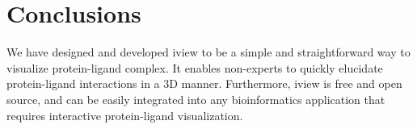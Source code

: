 \documentclass[twocolumn]{bmcart}%
\begin{document}
\section*{Conclusions}
We have designed and developed iview to be a simple and straightforward way to visualize protein-ligand complex. It enables non-experts to quickly elucidate protein-ligand interactions in a 3D manner. Furthermore, iview is free and open source, and can be easily integrated into any bioinformatics application that requires interactive protein-ligand visualization.

\end{document}
